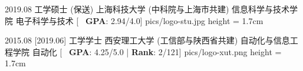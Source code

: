 \begin{educations}
    \education
    {2019.08}
    {工学硕士 (保送)}
    {上海科技大学 (中科院与上海市共建)}
    {信息科学与技术学院}
    {电子科学与技术}
    [\textbullet ~ \textbf{GPA}: 2.94/4.0]
    {pics/logo-stu.jpg} {height = 1.7cm}

    \separator{0.5ex}
    \education
    {2015.08}
    [2019.06]
    {工学学士}
    {西安理工大学 (工信部与陕西省共建)}
    {自动化与信息工程学院}
    {自动化}
    [\textbullet ~ \textbf{GPA}: 4.25/5.0 | \textbf{Rank}: 2/121]
    {pics/logo-xut.png} {height = 1.7cm}

\end{educations}